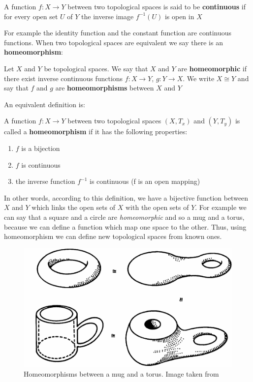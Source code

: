 \begin{definition}
 A function $f \colon X \rightarrow Y$ between two topological spaces is said to be \textbf{continuous} if for every open set $U$ of $Y$ the inverse image $f^{-1}(U)$ is open in $X$
\end{definition}

For example the identity function and the constant function are continuous functions. When two topological spaces are equivalent we say there is an \textbf{homeomorphism}:

\begin{definition}[Homeomorphism]
 Let $X$ and $Y$ be topological spaces. We say that $X$ and $Y$ are \textbf{homeomorphic} if there exist inverse continuous functions $f \colon X \rightarrow Y$, $g \colon Y \rightarrow X$. We write $X \cong Y$ and say that $f$ and $g$ are \textbf{homeomorphisms} between $X$ and $Y$
\end{definition}

An equivalent definition is:
\begin{definition}[Homeomorphism(2)]
 A function $f \colon X \rightarrow Y$ between two topological spaces $(X,T_{x})$ and $(Y, T_{y})$ is called a \textbf{homeomorphism} if it has the following properties:
 \begin{enumerate}
  \item $f$ is a bijection
  \item $f$ is continuous
  \item the inverse function $f^{-1}$ is continuous (f is an open mapping)
 \end{enumerate}

\end{definition}

In other words, according to this definition, we have a bijective function between $X$ and $Y$ which links the open sets of $X$ with the open sets of $Y$. For example we can say that a square and a circle are \textit{homeomorphic} and so a mug and a torus, because we can define a function which map one space to the other. Thus, using homeomorphism we can define new topological spaces from known ones.\\

\begin{figure}[htb] %
   \centering
   \includegraphics[width=0.45\linewidth]{images/mugTorus.png}
   \caption[Homeomorphisms between a mug and a torus]{Homeomorphisms between a mug and a torus. Image taken from~\cite{Kosniowski}}
   \label{fig:homeomorphisms}
\end{figure}

